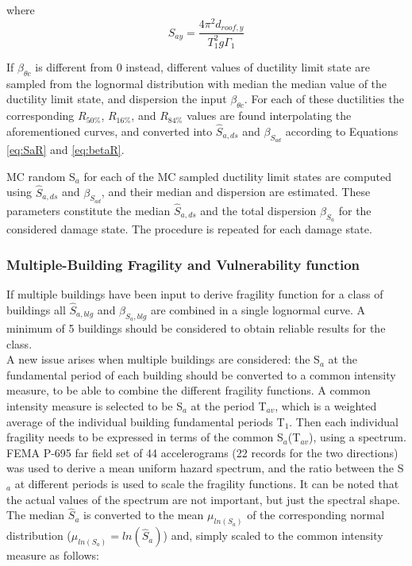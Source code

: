 where
\begin{equation}
S_{ay} = \frac{4 \pi^2 d_{roof,y}}{T_1^2 g \Gamma_1}
\label{eq:Say}
\end{equation}

If $\beta_{\theta c}$ is different from 0 instead, different values of ductility limit state are sampled from the lognormal distribution with median the median value of the ductility limit state, and dispersion the input $\beta_{\theta c}$.
For each of these ductilities the corresponding $R_{50\%}$, $R_{16\%}$, and $R_{84\%}$ values are found interpolating the aforementioned curves, and converted into $\hat{S}_{a,ds}$ and $\beta_{S_{a d}}$ according to Equations \ref{eq:SaR} and \ref{eq:betaR}.

MC random S$_a$ for each of the MC sampled ductility limit states are computed using $\hat{S}_{a,ds}$ and $\beta_{S_{a d}}$, and their median and dispersion are estimated. These parameters constitute the median $\hat{S}_{a,ds}$ and the total dispersion $\beta_{S_a}$ for the considered damage state. The procedure is repeated for each damage state.

\subsubsection{Multiple-Building Fragility and Vulnerability function}
\label{subsubsec:multiple-buildings}
If multiple buildings have been input to derive fragility function for a class of buildings all $\hat{S}_{a, blg}$ and $\beta_{S_a, blg}$ are combined in a single lognormal curve. A minimum of 5 buildings should be considered to obtain reliable results for the class.\\ 
A new issue arises when multiple buildings are considered: the S$_a$ at the fundamental period of each building should be converted to a common intensity measure, to be able to combine the different fragility functions. A common intensity measure is selected to be S$_a$ at the period T$_{av}$, which is a weighted average of the individual building fundamental periods T$_1$. Then each individual fragility needs to be expressed in terms of the common S$_a$(T$_{av}$), using a spectrum. FEMA P-695 far field set of 44 accelerograms (22 records for the two directions) was used to derive a mean uniform hazard spectrum, and the ratio between the S$_a$ at different periods is used to scale the fragility functions. It can be noted that the actual values of the spectrum are not important, but just the spectral shape. 
The median $\hat{S}_a$ is converted to the mean $\mu_{ln(S_a)}$ of the corresponding normal distribution ($\mu_{ln(S_a)} = ln(\hat{S}_a)$) and, simply scaled to the common intensity measure as follows:

